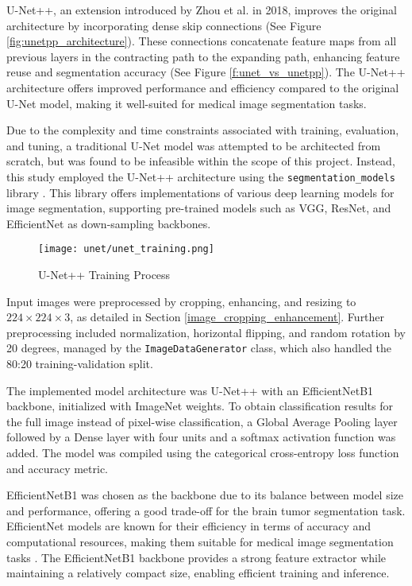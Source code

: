 U-Net++, an extension introduced by Zhou et al. in 2018, improves the original architecture by incorporating dense skip connections (See Figure \ref{fig:unetpp_architecture}). These connections concatenate feature maps from all previous layers in the contracting path to the expanding path, enhancing feature reuse and segmentation accuracy \cite{zhou_unet_2018, zhou2019unetplusplus, zhou2018unetplusplus, zhou2021towards} (See Figure \ref{f:unet_vs_unetpp}). The U-Net++ architecture offers improved performance and efficiency compared to the original U-Net model, making it well-suited for medical image segmentation tasks.

Due to the complexity and time constraints associated with training, evaluation, and tuning, a traditional U-Net model was attempted to be architected from scratch, but was found to be infeasible within the scope of this project. Instead, this study employed the U-Net++ architecture using the \texttt{segmentation\_models} library \cite{Yakubovskiy_2019}. This library offers implementations of various deep learning models for image segmentation, supporting pre-trained models such as VGG, ResNet, and EfficientNet as down-sampling backbones.

\begin{figure}[H]
  \begin{center}
    \texttt{[image: unet/unet\_training.png]}
  \end{center}
  \caption{U-Net++ Training Process}\label{f:unet_training}
\end{figure}

Input images were preprocessed by cropping, enhancing, and resizing to $224 \times 224 \times 3$, as detailed in Section \ref{image_cropping_enhancement}. Further preprocessing included normalization, horizontal flipping, and random rotation by 20 degrees, managed by the \texttt{ImageDataGenerator} class, which also handled the 80:20 training-validation split.

The implemented model architecture was U-Net++ with an EfficientNetB1 backbone, initialized with ImageNet weights. To obtain classification results for the full image instead of pixel-wise classification, a Global Average Pooling layer followed by a Dense layer with four units and a softmax activation function was added. The model was compiled using the categorical cross-entropy loss function and accuracy metric.

EfficientNetB1 was chosen as the backbone due to its balance between model size and performance, offering a good trade-off for the brain tumor segmentation task. EfficientNet models are known for their efficiency in terms of accuracy and computational resources, making them suitable for medical image segmentation tasks \cite{hastomo_classification_2024}. The EfficientNetB1 backbone provides a strong feature extractor while maintaining a relatively compact size, enabling efficient training and inference.

